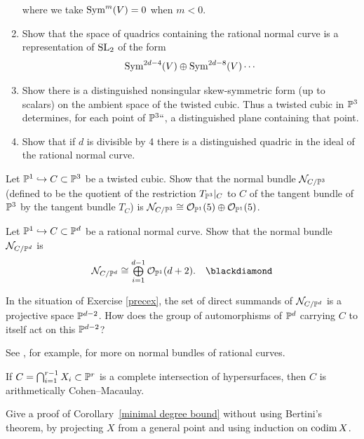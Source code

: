 \begin{exercise}
\begin{enumerate}
where we take $\operatorname{Sym}^{m}(V)=0$ when $m<0$.
 \item Show that the space of quadrics containing the rational normal curve is a representation of $\operatorname{SL}_2$ of the form
 $$
 \operatorname{Sym}^{2d-4}(V)\oplus \operatorname{Sym}^{2d-8}(V) \cdots
 $$
  \item Show  there is a distinguished nonsingular
%
%
skew-symmetric form (up to scalars) on the ambient space of the twisted cubic.
Thus a twisted cubic in ${\mathbb P}^3$ determines, for each point of ${\mathbb P}^3` `$, a distinguished plane containing that point.
 \item Show that if $d$ is divisible by 4 there is a distinguished quadric in the ideal of the rational normal curve.
\end{enumerate}
\end{exercise}

\begin{exercise}\label{Normal bundle of cubic}
Let ${\mathbb P}^1 \hookrightarrow C \subset {\mathbb P}^3$ be a
twisted cubic.
%
Show that the normal bundle
%
${\mathcal N}_{C/{\mathbb P}^3}$ (defined to be the quotient of the restriction
$T_{{\mathbb P}^3}|_C$ to $C$ of the tangent bundle  of ${\mathbb P}^3$  by the
tangent bundle $T_C$) is
${\mathcal N}_{C/{\mathbb P}^3} \cong {\mathcal O}_{{\mathbb P}^1}(5) \oplus  {\mathcal O}_{{\mathbb P}^1}(5)$.
\end{exercise}

\begin{exercise}
Let ${\mathbb P}^1 \hookrightarrow C \subset {\mathbb P}^d$ be a rational normal
%
curve. Show that the
normal bundle
%
${\mathcal N}_{C/{\mathbb P}^d}$  is
\label{precex}
$$
\tsty
\cN_{C/\PP^d} \cong \bigoplus\limits_{i=1}^{d-1} \cO_{\PP^1}(d+2).
\tohint{3.14}
$$
\end{exercise}

\begin{exercise}
In the situation of
Exercise \ref{precex},
the set  of direct summands
of ${\mathcal N}_{C/{\mathbb P}^d} $ is a projective space ${\mathbb P}^{d-2}$. How does the
group of automorphisms of ${\mathbb P}^d$ carrying $C$ to itself act on this ${\mathbb P}^{d-2}$?
\end{exercise}

See \cite{MR3778979}, for example,
%
%
for more on normal bundles of rational curves.

\begin{exercise}\label{ci is acm}
If $C=\bigcap_{i = 1}^{r-1}X_i \subset {\mathbb P}^r$ is a
%
complete intersection
 of hypersurfaces,
then $C$ is
%
arithmetically Cohen--Macaulay.
\end{exercise}

\begin{exercise}
Give a proof of Corollary~\ref{minimal degree bound} without using
Bertini's theorem, by projecting $X$ from a general point and using
induction on $\operatorname{codim} X$.
\end{exercise}

